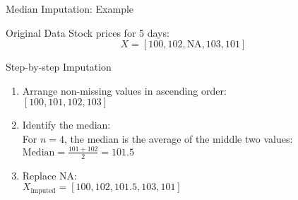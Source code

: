 \documentclass{beamer}
\begin{document}
\begin{frame}{Median Imputation: Example}
   \begin{block}{Original Data}
       Stock prices for 5 days:
       \[
       X = [100, 102, \text{NA}, 103, 101]
       \]
   \end{block}

   \begin{block}{Step-by-step Imputation}
       \begin{enumerate}
           \item Arrange non-missing values in ascending order:\\
           $[100, 101, 102, 103]$
           \item Identify the median:\\
           For $n=4$, the median is the average of the middle two values:\\
           $\text{Median} = \frac{101 + 102}{2} = 101.5$
           \item Replace NA:\\
           $X_{\text{imputed}} = [100, 102, \mathbf{101.5}, 103, 101]$
       \end{enumerate}
   \end{block}
\end{frame}
\end{document}
